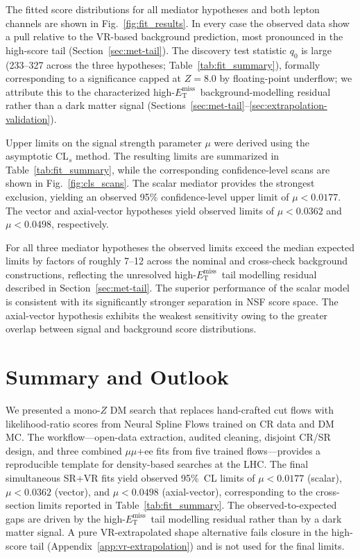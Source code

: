 \documentclass[11pt,a4paper,twocolumn]{article}
\newcommand{\MET}{\ensuremath{E_{\mathrm{T}}^{\mathrm{miss}}}}
\begin{document}
The fitted score distributions for all mediator hypotheses and both lepton
channels are shown in Fig.~\ref{fig:fit_results}. In every case the observed
data show a pull relative to the VR-based background prediction, most
pronounced in the high-score tail (Section~\ref{sec:met-tail}).
The discovery test statistic \(q_0\) is large (233--327 across the three
hypotheses; Table~\ref{tab:fit_summary}), formally corresponding to a
significance capped at \(Z=8.0\) by floating-point underflow; we attribute
this to the characterized high-\MET\ background-modelling residual rather
than a dark matter signal (Sections~\ref{sec:met-tail}--\ref{sec:extrapolation-validation}).

Upper limits on the signal strength parameter $\mu$ were derived using the
asymptotic CL$_s$ method. The resulting limits are summarized in
Table~\ref{tab:fit_summary}, while the corresponding confidence-level scans
are shown in Fig.~\ref{fig:cls_scans}. The scalar mediator provides the
strongest exclusion, yielding an observed 95\% confidence-level upper limit
of $\mu < 0.0177$. The vector and axial-vector hypotheses yield observed
limits of $\mu < 0.0362$ and $\mu < 0.0498$, respectively.

For all three mediator hypotheses the observed limits exceed the median
expected limits by factors of roughly 7--12 across the nominal and cross-check
background constructions, reflecting the unresolved high-\MET\ tail
modelling residual described in Section~\ref{sec:met-tail}. The superior
performance of the scalar model is consistent with its significantly
stronger separation in NSF score space. The axial-vector hypothesis
exhibits the weakest sensitivity owing to the greater overlap between
signal and background score distributions.

\section{Summary and Outlook}
\label{sec:summary}

We presented a mono-$Z$ DM search that replaces hand-crafted cut flows with
likelihood-ratio scores from Neural Spline Flows trained on CR data and DM MC.
The workflow---open-data extraction, audited cleaning, disjoint CR/SR design, and
three combined $\mu\mu$+ee fits from five trained flows---provides a reproducible
template for density-based searches at the LHC. The final simultaneous SR+VR
fits yield observed 95\%~CL limits of $\mu<0.0177$ (scalar),
$\mu<0.0362$ (vector), and $\mu<0.0498$
(axial-vector), corresponding to the cross-section limits reported in
Table~\ref{tab:fit_summary}. The observed-to-expected gaps are driven by the
high-\MET\ tail modelling residual rather than by a dark matter signal.
A pure VR-extrapolated shape alternative fails closure in the high-score
tail (Appendix~\ref{app:vr-extrapolation}) and is not used for the final limits.
\end{document}

